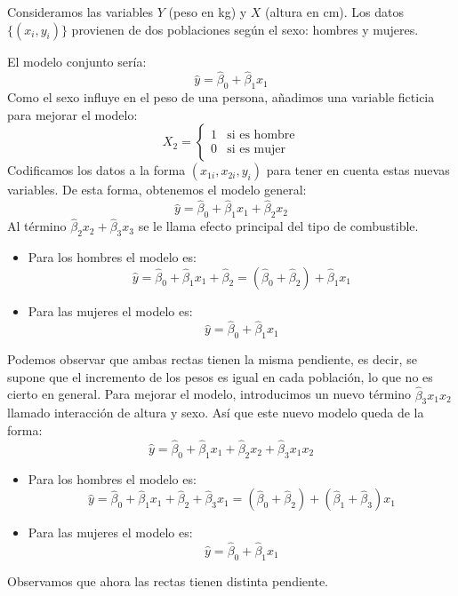 \begin{example}
    Consideramos las variables $Y$ (peso en kg) y $X$ (altura en cm).
    Los datos $\{(x_i, y_i)\}$ provienen de dos poblaciones según el sexo: hombres y mujeres.

    El modelo conjunto sería:
    $$\hat{y} = \hat{\beta}_0 + \hat{\beta}_1x_1$$
    Como el sexo influye en el peso de una persona, añadimos una variable ficticia para mejorar el modelo:
    $$X_2 = \begin{cases}
            1 & \text{si es hombre} \\
            0 & \text{si es mujer}
        \end{cases}$$
    Codificamos los datos a la forma $(x_{1i}, x_{2i}, y_i)$ para tener en cuenta estas nuevas variables.
    De esta forma, obtenemos el modelo general:
    $$\hat{y} = \hat{\beta}_0 + \hat{\beta}_1x_1 + \hat{\beta}_2x_2$$
    Al término $\hat{\beta}_2x_2 + \hat{\beta}_3x_3$ se le llama efecto principal del tipo de combustible.
    \begin{itemize}
        \item Para los hombres el modelo es:
              $$\hat{y} = \hat{\beta}_0 + \hat{\beta}_1x_1 + \hat{\beta}_2 = (\hat{\beta}_0 + \hat{\beta}_2) + \hat{\beta}_1x_1$$
        \item Para las mujeres el modelo es:
              $$\hat{y} = \hat{\beta}_0 + \hat{\beta}_1x_1$$
    \end{itemize}

    Podemos observar que ambas rectas tienen la misma pendiente, es decir, se supone que el incremento de los pesos es igual en cada población, lo que no es cierto en general.
    Para mejorar el modelo, introducimos un nuevo término $\hat{\beta}_3x_1x_2$ llamado interacción de altura y sexo.
    Así que este nuevo modelo queda de la forma:
    $$\hat{y} = \hat{\beta}_0 + \hat{\beta}_1x_1 + \hat{\beta}_2x_2 + \hat{\beta}_3x_1x_2$$
    \begin{itemize}
        \item Para los hombres el modelo es:
              $$\hat{y} = \hat{\beta}_0 + \hat{\beta}_1x_1 + \hat{\beta}_2 + \hat{\beta}_3x_1 = (\hat{\beta}_0 + \hat{\beta}_2) + (\hat{\beta}_1 + \hat{\beta}_3)x_1$$
        \item Para las mujeres el modelo es:
              $$\hat{y} = \hat{\beta}_0 + \hat{\beta}_1x_1$$
    \end{itemize}
    Observamos que ahora las rectas tienen distinta pendiente.


\end{example}
